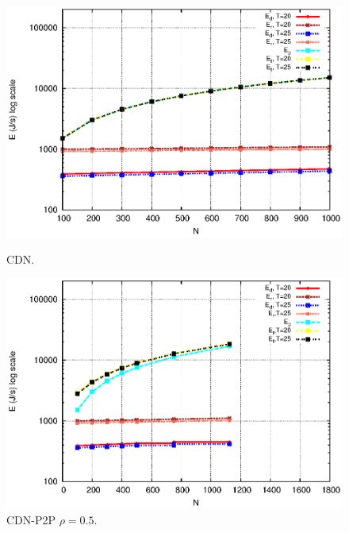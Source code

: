 \documentclass[conference]{IEEEtran}
\begin{document}
\begin{figure}[htp!]
\centering
\begin{minipage}[b]{0.4\linewidth}
	\includegraphics[scale=0.5]{graphs/cdn.eps}
	\caption{CDN.}
	\label{fig:4-0}
\end{minipage}
\hfill
\begin{minipage}[b]{0.4\linewidth}
	\includegraphics[scale=0.5]{graphs/cdnp2p-2.eps}
	\caption{CDN-P2P $\rho=0.5$.}
	\label{fig:4-2}
\end{minipage}
\hfill
\begin{minipage}[b]{0.4\linewidth}

\end{minipage}
\end{figure}
\end{document}
